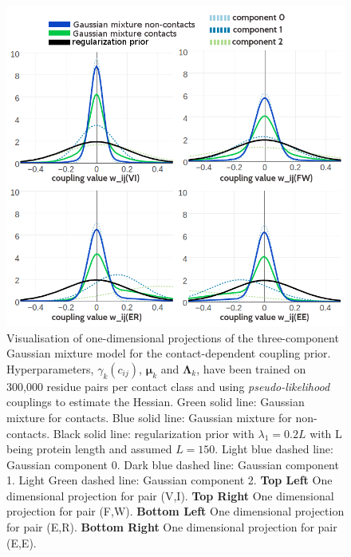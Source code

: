\documentclass[11pt,a4paper,twoside]{book}
\newcommand{\eq}{\!=\!}
\newcommand{\Lk}{\mathbf{\Lambda}_k}
\newcommand{\muk}{\mathbf{\mu}_k}
\newcommand{\cij}{c_{ij}}
\theoremstyle{definition}
\theoremstyle{definition}
\theoremstyle{remark}
\begin{document}
\begin{figure}
\includegraphics[width=1\linewidth]{img/bayesian_model/pll/3/1dvis_combined_300k} \caption{Visualisation of one-dimensional
projections of the three-component Gaussian mixture model for the
contact-dependent coupling prior. Hyperparameters, \(\gamma_k(\cij)\),
\(\muk\) and \(\Lk\), have been trained on 300,000 residue pairs per
contact class and using \emph{pseudo-likelihood} couplings to estimate
the Hessian. Green solid line: Gaussian mixture for contacts. Blue solid
line: Gaussian mixture for non-contacts. Black solid line:
regularization prior with \(\lambda_1 \eq 0.2L\) with L being protein
length and assumed \(L\eq150\). Light blue dashed line: Gaussian
component 0. Dark blue dashed line: Gaussian component 1. Light Green
dashed line: Gaussian component 2. \textbf{Top Left} One dimensional
projection for pair (V,I). \textbf{Top Right} One dimensional projection
for pair (F,W). \textbf{Bottom Left} One dimensional projection for pair
(E,R). \textbf{Bottom Right} One dimensional projection for pair (E,E).}\label{fig:vis1d-pll-3comp-300k}
\end{figure}
\end{document}
